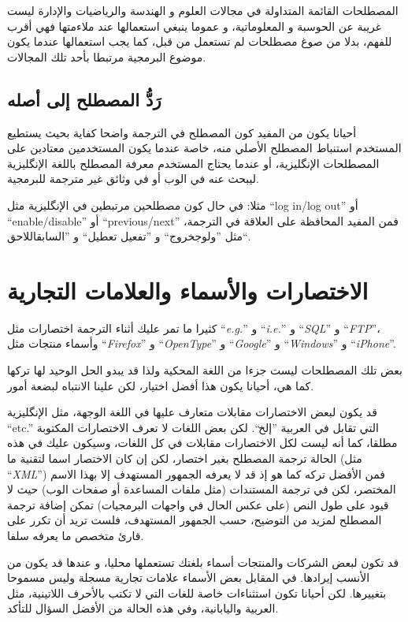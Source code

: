 المصطلحات القائمة المتداولة في مجالات العلوم و الهندسة والرياضيات
والإدارة ليست غريبة عن الحوسبة و المعلوماتية، و عموما ينبغي استعمالها
عند ملاءمتها فهي أقرب للفهم، بدلا من صوغ مصطلحات لم تستعمل من قبل، كما
يجب استعمالها عندما يكون موضوع البرمجية مرتبطا بأحد تلك المجالات.

\subsection{رَدُّ المصطلح إلى أصله}
أحيانا يكون من المفيد كون المصطلح في الترجمة واضحا كفاية بحيث يستطيع
المستخدم استنباط المصطلح الأصلي منه، خاصة عندما يكون المستخدمين معتادين
على المصطلحات الإنگليزية، أو عندما يحتاج المستخدم معرفة المصطلح باللغة
الإنگليزية ليبحث عنه في الوب أو في وثائق غير مترجمة للبرمجية.

مثلا: في حال كون مصطلحين مرتبطين في الإنگليزية مثل “log in/log out” أو
“enable/disable” أو “previous/next” فمن المفيد المحافظة على العلاقة في
الترجمة، مثل ”ولوج خروج“ و ”تفعيل
تعطيل“ و ”السابق اللاحق“.

\section{الاختصارات والأسماء والعلامات التجارية}
كثيرا ما تمر عليك أثناء الترجمة
اختصارات مثل “{\it e.g.}” و “{\it i.e.}” و “{\it SQL}” و “{\it FTP}”،
وأسماء منتجات مثل “{\it Firefox}” و “{\it OpenType}” و “{\it Google}” و
“{\it Windows}” و “{\it iPhone}”.

بعض تلك المصطلحات ليست جزءا من اللغة المحكية ولذا قد يبدو الحل الوحيد
لها تركها كما هي، أحيانا يكون هذا أفضل اختيار، لكن علينا الانتباه لبضعة
أمور.

قد يكون لبعض الاختصارات مقابلات متعارف عليها في اللغة الوجهة، مثل
الإنگليزية “etc.” التي تقابل في العربية ”إلخ“. لكن بعض اللغات لا تعرف
الاختصارات المكتوبة مطلقا، كما أنه ليست لكل الاختصارات مقابلات في كل
اللغات، وسيكون عليك في هذه الحالة ترجمة المصطلح بغير اختصار، لكن إن كان
الاختصار اسما لتقنية ما (مثل “{\it XML}”) فمن الأفضل تركه كما هو إذ قد
لا يعرفه الجمهور المستهدف إلا بهذا الاسم المختصر، لكن في ترجمة
المستندات (مثل ملفات المساعدة أو صفحات الوب) حيث لا قيود على طول النص
(على عكس الحال في واجهات البرمجيات) تمكن إضافة ترجمة المصطلح لمزيد من
التوضيح، حسب الجمهور المستهدف، فلست تريد أن تكرر على قارئ متخصص ما
يعرفه سلفا.

قد تكون لبعض الشركات والمنتجات أسماء بلغتك تستعملها محليا، و عندها قد
يكون من الأنسب إيرادها. في المقابل بعض الأسماء علامات تجارية مسجلة وليس
مسموحا بتغييرها. لكن أحيانا تكون استثناءات خاصة للغات التي لا تكتب
بالأحرف اللاتينية، مثل العربية واليابانية، وفي هذه الحالة من الأفضل
السؤال للتأكد.

